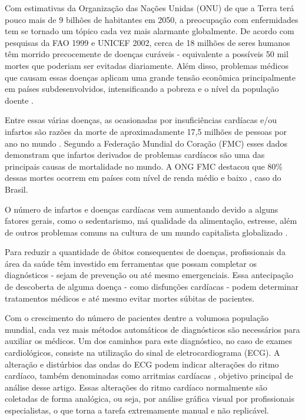 \documentclass[conference]{IEEEtran}
\begin{document}
Com estimativas da Organização das Nações Unidas (ONU) de que a Terra terá pouco mais de 9 bilhões de habitantes em 2050, a preocupação com enfermidades tem se tornado um tópico cada vez mais alarmante globalmente. De acordo com pesquisas da FAO 1999 e UNICEF 2002, cerca de 18 milhões de seres humanos têm morrido precocemente de doenças curáveis - equivalente a possíveis 50 mil mortes que poderiam ser evitadas diariamente. Além disso, problemas médicos que causam essas doenças aplicam uma grande tensão econômica principalmente em países subdesenvolvidos, intensificando a pobreza e o nível da população doente \cite{pogge05}.

Entre essas várias doenças, as ocasionadas por insuficiências cardíacas e/ou infartos são razões da morte de aproximadamente 17,5 milhões de pessoas por ano no mundo \cite{whf02}. Segundo a Federação Mundial do Coração (FMC) esses dados demonstram que infartos derivados de problemas cardíacos são uma das principais causas de mortalidade no mundo. A ONG FMC destacou que 80\% dessas mortes ocorrem em países com nível de renda médio e baixo \cite{whf02}, caso do Brasil.

O número de infartos e doenças cardíacas vem aumentando devido a alguns fatores gerais, como o sedentarismo, má qualidade da alimentação, estresse, além de outros problemas comuns na cultura de um mundo capitalista globalizado \cite{beckert09}.

Para reduzir a quantidade de óbitos consequentes de doenças, profissionais da área da saúde têm investido em ferramentas que possam completar os diagnósticos - sejam de prevenção ou até mesmo emergenciais. Essa antecipação de descoberta de alguma doença - como disfunções cardíacas - podem determinar tratamentos médicos e até mesmo evitar mortes súbitas de pacientes.

Com o crescimento do número de pacientes dentre a volumosa população mundial, cada vez mais métodos automáticos de diagnósticos são necessários para auxiliar os médicos. Um dos caminhos para este diagnóstico, no caso de exames cardiológicos, consiste na utilização do sinal de eletrocardiograma (ECG). A alteração e distúrbios das ondas do ECG podem indicar alterações do ritmo cardíaco, também denominadas como arritmias cardíacas \cite{beckert09}, objetivo principal de análise desse artigo. Essas alterações do ritmo cardíaco normalmente são coletadas de forma analógica, ou seja, por análise gráfica visual por profissionais especialistas, o que torna a tarefa extremamente manual e não replicável.
\end{document}
